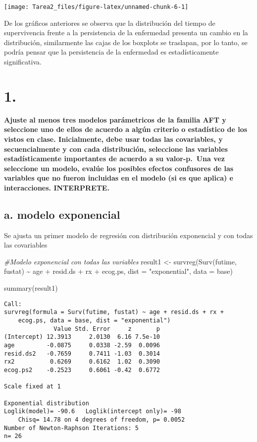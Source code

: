 \documentclass[
]{article}
\newenvironment{Shaded}{\begin{snugshade}}{\end{snugshade}}
\newcommand{\AttributeTok}[1]{\textcolor[rgb]{0.77,0.63,0.00}{#1}}
\newcommand{\CommentTok}[1]{\textcolor[rgb]{0.56,0.35,0.01}{\textit{#1}}}
\newcommand{\FunctionTok}[1]{\textcolor[rgb]{0.00,0.00,0.00}{#1}}
\newcommand{\NormalTok}[1]{#1}
\newcommand{\OtherTok}[1]{\textcolor[rgb]{0.56,0.35,0.01}{#1}}
\newcommand{\SpecialCharTok}[1]{\textcolor[rgb]{0.00,0.00,0.00}{#1}}
\newcommand{\StringTok}[1]{\textcolor[rgb]{0.31,0.60,0.02}{#1}}
\begin{document}
\begin{center}\texttt{[image: Tarea2\_files/figure-latex/unnamed-chunk-6-1]} \end{center}

De los gráficos anteriores se observa que la distribución del tiempo de
supervivencia frente a la persistencia de la enfermedad presenta un
cambio en la distribución, similarmente las cajas de los boxplots se
traslapan, por lo tanto, se podría pensar que la persistencia de la
enfermedad es estadísticamente significativa.

\section{1. }

\textbf{Ajuste al menos tres modelos parámetricos de la familia AFT y
seleccione uno de ellos de acuerdo a algún criterio o estadístico de los
vistos en clase. Inicialmente, debe usar todas las covariables, y
secuencialmente y con cada distribución, seleccione las variables
estadísticamente importantes de acuerdo a su valor-p.~Una vez seleccione
un modelo, evalúe los posibles efectos confusores de las variables que
no fueron incluidas en el modelo (si es que aplica) e interacciones.
INTERPRETE.}

\subsection{a. modelo exponencial}

Se ajusta un primer modelo de regresión con distribución exponencial y
con todas las covariables

\begin{Shaded}
\begin{Highlighting}[]
\CommentTok{\#Modelo exponencial con todas las variables}
\NormalTok{result1 }\OtherTok{\textless{}{-}} \FunctionTok{survreg}\NormalTok{(}\FunctionTok{Surv}\NormalTok{(futime, fustat) }\SpecialCharTok{\textasciitilde{}}\NormalTok{ age }\SpecialCharTok{+}\NormalTok{ resid.ds }\SpecialCharTok{+}\NormalTok{ rx }\SpecialCharTok{+}\NormalTok{ ecog.ps, }\AttributeTok{dist =} \StringTok{"exponential"}\NormalTok{, }\AttributeTok{data =}\NormalTok{ base) }

\FunctionTok{summary}\NormalTok{(result1)}
\end{Highlighting}
\end{Shaded}

\begin{verbatim}
Call:
survreg(formula = Surv(futime, fustat) ~ age + resid.ds + rx + 
    ecog.ps, data = base, dist = "exponential")
              Value Std. Error     z       p
(Intercept) 12.3913     2.0130  6.16 7.5e-10
age         -0.0875     0.0338 -2.59  0.0096
resid.ds2   -0.7659     0.7411 -1.03  0.3014
rx2          0.6269     0.6162  1.02  0.3090
ecog.ps2    -0.2523     0.6061 -0.42  0.6772

Scale fixed at 1 

Exponential distribution
Loglik(model)= -90.6   Loglik(intercept only)= -98
    Chisq= 14.78 on 4 degrees of freedom, p= 0.0052 
Number of Newton-Raphson Iterations: 5 
n= 26 
\end{verbatim}
\end{document}
